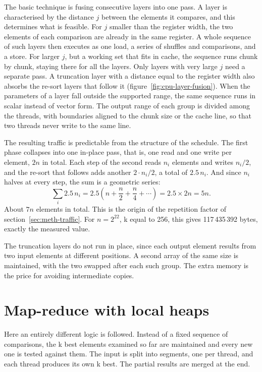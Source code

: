The basic technique is fusing consecutive layers into one pass. A layer is
characterised by the distance $j$ between the elements it compares, and this
determines what is feasible. For $j$ smaller than the register width, the two
elements of each comparison are already in the same register. A whole sequence
of such layers then executes as one load, a series of shuffles and comparisons,
and a store. For larger $j$, but a working set that fits in cache, the sequence
runs chunk by chunk, staying there for all the layers. Only layers with very
large $j$ need a separate pass. A truncation layer with a distance equal to the
register width also absorbs the re-sort layers that follow it
(figure~\ref{fig:cpu-layer-fusion}). When the parameters of a layer fall
outside the supported range, the same sequence runs in scalar instead of vector
form. The output range of each group is divided among the threads, with
boundaries aligned to the chunk size or the cache line, so that two threads
never write to the same line.

The resulting traffic is predictable from the structure of the schedule. The
first phase collapses into one in-place pass, that is, one read and one write
per element, $2n$ in total. Each step of the second reads $n_i$ elements and
writes $n_i/2$, and the re-sort that follows adds another $2 \cdot n_i/2$, a
total of $2.5\,n_i$. And since $n_i$ halves at every step, the sum is a
geometric series:
\[
	\sum_i 2.5\,n_i = 2.5 \left( n + \frac{n}{2} + \frac{n}{4} + \cdots \right) = 2.5 \times 2n = 5n.
\]
About $7n$ elements in total. This is the origin of the repetition factor of
section~\ref{sec:meth-traffic}. For $n = 2^{22}$, k equal to 256, this gives
117\,435\,392 bytes, exactly the measured value.

The truncation layers do not run in place, since each output element results
from two input elements at different positions. A second array of the same size
is maintained, with the two swapped after each such group. The extra memory is
the price for avoiding intermediate copies.



\section{Map-reduce with local heaps}
\label{sec:cpu-mapreduce}

Here an entirely different logic is followed. Instead of a fixed sequence of
comparisons, the k best elements examined so far are maintained and every new
one is tested against them. The input is split into segments, one per thread,
and each thread produces its own k best. The partial results are merged at the
end.


